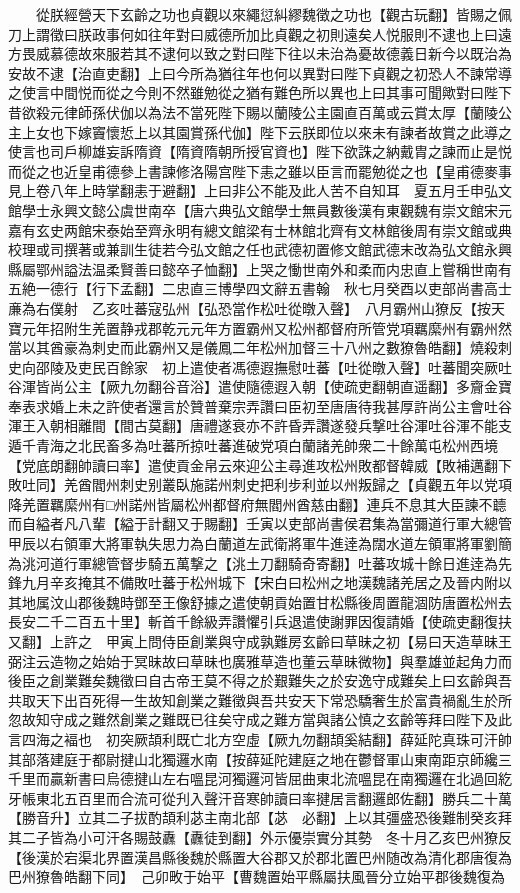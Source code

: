 　　從朕經營天下玄齡之功也貞觀以來繩愆糾繆魏徵之功也【觀古玩翻】皆賜之佩刀上謂徵曰朕政事何如往年對曰威德所加比貞觀之初則遠矣人悦服則不逮也上曰遠方畏威慕德故來服若其不逮何以致之對曰陛下往以未治為憂故德義日新今以既治為安故不逮【治直吏翻】上曰今所為猶往年也何以異對曰陛下貞觀之初恐人不諫常導之使言中間悦而從之今則不然雖勉從之猶有難色所以異也上曰其事可聞歟對曰陛下昔欲殺元律師孫伏伽以為法不當死陛下賜以蘭陵公主園直百萬或云賞太厚【蘭陵公主上女也下嫁竇懷悊上以其園賞孫代伽】陛下云朕即位以來未有諫者故賞之此導之使言也司戶柳雄妄訴隋資【隋資隋朝所授官資也】陛下欲誅之納戴胄之諫而止是悦而從之也近皇甫德參上書諫修洛陽宫陛下恚之雖以臣言而罷勉從之也【皇甫德麥事見上卷八年上時掌翻恚于避翻】上曰非公不能及此人苦不自知耳　夏五月壬申弘文館學士永興文懿公虞世南卒【唐六典弘文館學士無員數後漢有東觀魏有崇文館宋元嘉有玄史两館宋泰始至齊永明有總文館梁有士林館北齊有文林館後周有崇文館或典校理或司撰著或兼訓生徒若今弘文館之任也武德初置修文館武德末改為弘文館永興縣屬鄂州謚法温柔賢善曰懿卒子恤翻】上哭之慟世南外和柔而内忠直上嘗稱世南有五絶一德行【行下孟翻】二忠直三博學四文辭五書翰　秋七月癸酉以吏部尚書高士亷為右僕射　乙亥吐蕃寇弘州【弘恐當作松吐從暾入聲】　八月霸州山獠反【按天寶元年招附生羌置静戎郡乾元元年方置霸州又松州都督府所管党項羈縻州有霸州然當以其酋豪為刺史而此霸州又是儀鳳二年松州加督三十八州之數獠魯皓翻】燒殺刺史向邵陵及吏民百餘家　初上遣使者馮德遐撫慰吐蕃【吐從暾入聲】吐蕃聞突厥吐谷渾皆尚公主【厥九勿翻谷音浴】遣使隨德遐入朝【使疏吏翻朝直遥翻】多齎金寶奉表求婚上未之許使者還言於贊普棄宗弄讚曰臣初至唐唐待我甚厚許尚公主會吐谷渾王入朝相離間【間古莫翻】唐禮遂衰亦不許昏弄讚遂發兵撃吐谷渾吐谷渾不能支遁千青海之北民畜多為吐蕃所掠吐蕃進破党項白蘭諸羌帥衆二十餘萬屯松州西境【党底朗翻帥讀曰率】遣使貢金帛云來迎公主尋進攻松州敗都督韓威【敗補邁翻下敗吐同】羌酋閻州刺史别叢臥施諾州刺史把利步利並以州叛歸之【貞觀五年以党項降羌置羈縻州有□州諾州皆屬松州都督府無閻州酋慈由翻】連兵不息其大臣諫不聼而自縊者凡八輩【縊于計翻又于賜翻】壬寅以吏部尚書侯君集為當彌道行軍大總管甲辰以右領軍大將軍執失思力為白蘭道左武衛將軍牛進逹為闊水道左領軍將軍劉簡為洮河道行軍總管督步騎五萬撃之【洮土刀翻騎奇寄翻】吐蕃攻城十餘日進逹為先鋒九月辛亥掩其不備敗吐蕃于松州城下【宋白曰松州之地漢魏諸羌居之及晉内附以其地属汶山郡後魏時鄧至王像舒據之遣使朝貢始置甘松縣後周置龍涸防唐置松州去長安二千二百五十里】斬首千餘級弄讚懼引兵退遣使謝罪因復請婚【使疏吏翻復扶又翻】上許之　甲寅上問侍臣創業與守成孰難房玄齡曰草昧之初【易曰天造草昧王弼注云造物之始始于冥昧故曰草昧也廣雅草造也董云草昧微物】與羣雄並起角力而後臣之創業難矣魏徵曰自古帝王莫不得之於艱難失之於安逸守成難矣上曰玄齡與吾共取天下出百死得一生故知創業之難徵與吾共安天下常恐驕奢生於富貴禍亂生於所忽故知守成之難然創業之難既已往矣守成之難方當與諸公慎之玄齡等拜曰陛下及此言四海之褔也　初突厥頡利既亡北方空虛【厥九勿翻頡奚結翻】薛延陀真珠可汗帥其部落建庭于都尉揵山北獨邏水南【按薛延陀建庭之地在鬱督軍山東南距京師纔三千里而贏新書曰烏德揵山左右嗢昆河獨邏河皆屈曲東北流嗢昆在南獨邏在北過回紇牙帳東北五百里而合流可從刋入聲汗音寒帥讀曰率揵居言翻邏郎佐翻】勝兵二十萬【勝音升】立其二子拔酌頡利苾主南北部【苾　必翻】上以其彊盛恐後難制癸亥拜其二子皆為小可汗各賜鼓纛【纛徒到翻】外示優崇實分其勢　冬十月乙亥巴州獠反【後漢於宕渠北界置漢昌縣後魏於縣置大谷郡又於郡北置巴州随改為清化郡唐復為巴州獠魯皓翻下同】　己卯畋于始平【曹魏置始平縣屬扶風晉分立始平郡後魏復為